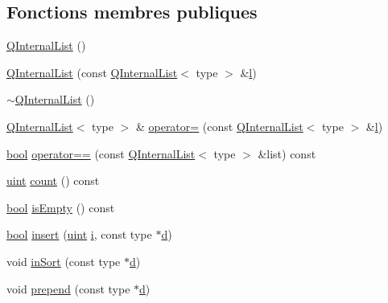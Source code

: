 \subsection*{Fonctions membres publiques}
\begin{DoxyCompactItemize}
\item 
\hyperlink{class_q_internal_list_a45b1a8f825c98b5905805beeb2db203f}{Q\+Internal\+List} ()
\item 
\hyperlink{class_q_internal_list_abb800946ab7033290a33901b00e0577e}{Q\+Internal\+List} (const \hyperlink{class_q_internal_list}{Q\+Internal\+List}$<$ type $>$ \&\hyperlink{060__command__switch_8tcl_aff56f84b49947b84b2a304f51cf8e678}{l})
\item 
\hyperlink{class_q_internal_list_aeac02a35fc8c73e11a73b81569d40223}{$\sim$\+Q\+Internal\+List} ()
\item 
\hyperlink{class_q_internal_list}{Q\+Internal\+List}$<$ type $>$ \& \hyperlink{class_q_internal_list_a355c04fc3d3895ec3ce647e631987cff}{operator=} (const \hyperlink{class_q_internal_list}{Q\+Internal\+List}$<$ type $>$ \&\hyperlink{060__command__switch_8tcl_aff56f84b49947b84b2a304f51cf8e678}{l})
\item 
\hyperlink{qglobal_8h_a1062901a7428fdd9c7f180f5e01ea056}{bool} \hyperlink{class_q_internal_list_a2a8d320748a3f78e1e8f82833035bb73}{operator==} (const \hyperlink{class_q_internal_list}{Q\+Internal\+List}$<$ type $>$ \&list) const 
\item 
\hyperlink{qglobal_8h_a4d3943ddea65db7163a58e6c7e8df95a}{uint} \hyperlink{class_q_internal_list_a6d6c40e6a7fa0a86844e7b44a38286c4}{count} () const 
\item 
\hyperlink{qglobal_8h_a1062901a7428fdd9c7f180f5e01ea056}{bool} \hyperlink{class_q_internal_list_adb90af68c1512e50489effd72f3925b3}{is\+Empty} () const 
\item 
\hyperlink{qglobal_8h_a1062901a7428fdd9c7f180f5e01ea056}{bool} \hyperlink{class_q_internal_list_abba980f96178571e6b956c06a63339ca}{insert} (\hyperlink{qglobal_8h_a4d3943ddea65db7163a58e6c7e8df95a}{uint} \hyperlink{060__command__switch_8tcl_a8c90afd4641b25be86bd09983c3cbee0}{i}, const type $\ast$\hyperlink{060__command__switch_8tcl_af43f4b1f0064a33b2d662af9f06d3a00}{d})
\item 
void \hyperlink{class_q_internal_list_a53f576343b9a7263676d90ea00cc2279}{in\+Sort} (const type $\ast$\hyperlink{060__command__switch_8tcl_af43f4b1f0064a33b2d662af9f06d3a00}{d})
\item 
void \hyperlink{class_q_internal_list_add8117593e024e3cade4229c368367ee}{prepend} (const type $\ast$\hyperlink{060__command__switch_8tcl_af43f4b1f0064a33b2d662af9f06d3a00}{d})

\end{DoxyCompactItemize}
